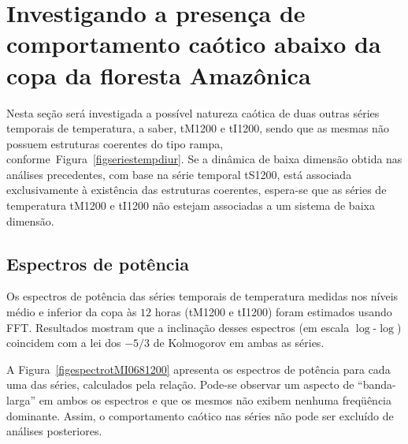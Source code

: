 \section{Investigando a presença de comportamento caótico abaixo da copa da floresta Amazônica}

Nesta seção será investigada a possível natureza caótica de duas outras séries temporais de temperatura, a saber, tM1200 e tI1200, sendo que as mesmas não possuem estruturas coerentes do tipo rampa, conforme~Figura~\ref{figseriestempdiur}. Se a dinâmica de baixa dimensão obtida nas análises precedentes, com base na série temporal tS1200, está associada exclusivamente à existência das estruturas coerentes, espera-se que as séries de temperatura tM1200 e tI1200 não estejam associadas a um sistema de baixa dimensão.

\subsection{Espectros de potência}

Os espectros de potência das séries temporais de temperatura medidas nos níveis médio e inferior da copa às $12$ horas (tM1200 e tI1200) foram estimados usando FFT. Resultados mostram que a inclinação desses espectros (em escala $\log$-$\log$) coincidem com a lei dos $-5/3$ de Kolmogorov em ambas as séries. 

A Figura~\ref{figespectrotMI0681200} apresenta os espectros de potência para cada uma das séries, calculados pela relação.%
Pode-se observar um aspecto de ``banda-larga'' em ambos os espectros e que os mesmos não exibem nenhuma freqüência dominante. Assim, o comportamento caótico nas séries não pode ser excluído de análises posteriores.


